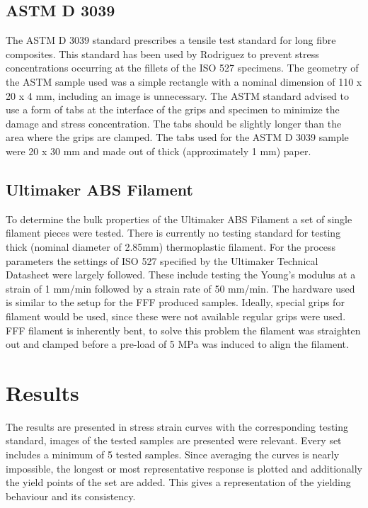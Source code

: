 \subsection{ASTM D 3039}
The ASTM D 3039 standard \cite{ASTM2008Standard3039} prescribes a tensile test standard for long fibre composites. This standard has been used by Rodriguez \cite{Rodriguez2001MechanicalInvestigation} to prevent  stress concentrations occurring at the fillets of the ISO 527 specimens. The geometry of the ASTM sample used was a simple rectangle with a nominal dimension of 110 x 20 x 4 mm, including an image is unnecessary. The ASTM standard advised to use a form of tabs at the interface of the grips and specimen to minimize the damage and stress concentration. The tabs should be slightly longer than the area where the grips are clamped. The tabs used for the ASTM D 3039 sample were 20 x 30 mm and made out of thick (approximately 1 mm) paper.

\subsection{Ultimaker ABS Filament}
To determine the bulk properties of the Ultimaker ABS Filament a set of single filament pieces were tested. There is currently no testing standard for testing thick (nominal diameter of 2.85mm) thermoplastic filament. For the process parameters the settings of ISO 527 specified by the Ultimaker Technical Datasheet \cite{Ultimaker2018TechnicalABS} were largely followed. These include testing the Young's modulus at a strain of 1 mm/min followed by a strain rate of 50 mm/min. The hardware used is similar to the setup for the FFF produced samples. Ideally, special grips for filament would be used, since these were not available regular grips were used. 
FFF filament is inherently bent, to solve this problem the filament was straighten out and clamped before a pre-load of 5 MPa was induced to align the filament. 

\section{Results}
The results are presented in stress strain curves with the corresponding testing standard, images of the tested samples are presented were relevant. Every set includes a minimum of 5 tested samples. Since averaging the curves is nearly impossible, the longest or most representative response is plotted and additionally the yield points of the set are added. This gives a representation of the yielding behaviour and its consistency. 


